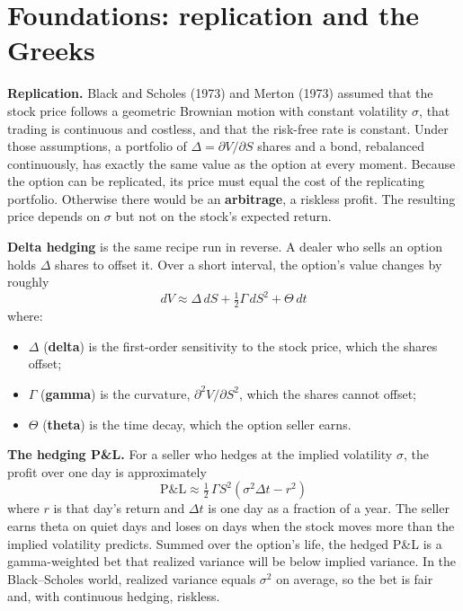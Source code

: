 \section{Foundations: replication and the Greeks}
\label{sec:15-foundations}

\textbf{Replication.} Black and Scholes (1973) and Merton (1973) assumed that the stock price follows a geometric Brownian motion with constant volatility $\sigma$, that trading is continuous and costless, and that the risk-free rate is constant. Under those assumptions, a portfolio of $\Delta = \partial V/\partial S$ shares and a bond, rebalanced continuously, has exactly the same value as the option at every moment. Because the option can be replicated, its price must equal the cost of the replicating portfolio. Otherwise there would be an \textbf{arbitrage}, a riskless profit. The resulting price depends on $\sigma$ but not on the stock's expected return.

\textbf{Delta hedging} is the same recipe run in reverse. A dealer who sells an option holds $\Delta$ shares to offset it. Over a short interval, the option's value changes by roughly
\begin{equation}
  dV \approx \Delta\,dS + \tfrac{1}{2}\Gamma\,dS^2 + \Theta\,dt
  \label{eq:15-taylor}
\end{equation}
where:

\begin{itemize}
  \item $\Delta$ (\textbf{delta}) is the first-order sensitivity to the stock price, which the shares offset;
  \item $\Gamma$ (\textbf{gamma}) is the curvature, $\partial^2 V/\partial S^2$, which the shares cannot offset;
  \item $\Theta$ (\textbf{theta}) is the time decay, which the option seller earns.
\end{itemize}

\textbf{The hedging P\&L.} For a seller who hedges at the implied volatility $\sigma$, the profit over one day is approximately
\begin{equation}
  \text{P\&L} \approx \tfrac{1}{2}\,\Gamma S^2 \left(\sigma^2 \Delta t - r^2\right)
  \label{eq:15-pnl}
\end{equation}
where $r$ is that day's return and $\Delta t$ is one day as a fraction of a year. The seller earns theta on quiet days and loses on days when the stock moves more than the implied volatility predicts. Summed over the option's life, the hedged P\&L is a gamma-weighted bet that realized variance will be below implied variance. In the Black--Scholes world, realized variance equals $\sigma^2$ on average, so the bet is fair and, with continuous hedging, riskless.

